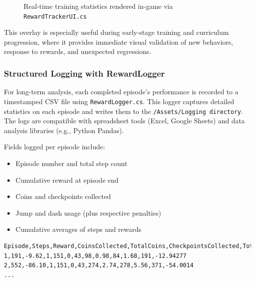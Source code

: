 \documentclass[12pt,oneside,openright,a4paper]{cpe-english-project}
\begin{document}
\begin{figure}[H]
\centering
{}
\caption{Real-time training statistics rendered in-game via \texttt{RewardTrackerUI.cs}}
\label{fig:RewardTrackerUI}
\end{figure}

This overlay is especially useful during early-stage training and curriculum progression, where it provides immediate visual validation of new behaviors, response to rewards, and unexpected regressions.

\subsubsection{Structured Logging with RewardLogger}

For long-term analysis, each completed episode’s performance is recorded to a timestamped CSV file using \texttt{RewardLogger.cs}. This logger captures detailed statistics on each episode and writes them to the \texttt{/Assets/Logging directory}. The logs are compatible with spreadsheet tools (Excel, Google Sheets) and data analysis libraries (e.g., Python Pandas).

Fields logged per episode include:

\begin{itemize}
\item Episode number and total step count
\item Cumulative reward at episode end
\item Coins and checkpoints collected
\item Jump and dash usage (plus respective penalties)
\item Cumulative averages of steps and rewards
\end{itemize}

\begin{lstlisting}
Episode,Steps,Reward,CoinsCollected,TotalCoins,CheckpointsCollected,TotalCheckpoints,JumpCount,JumpPenalty,DashCount,DashPenalty,CumulativeAvgSteps,CumulativeAvgRewards
1,191,-9.62,1,151,0,43,98,0.98,84,1.68,191,-12.94277
2,552,-86.10,1,151,0,43,274,2.74,278,5.56,371,-54.0014
...
\end{lstlisting}
\end{document}
